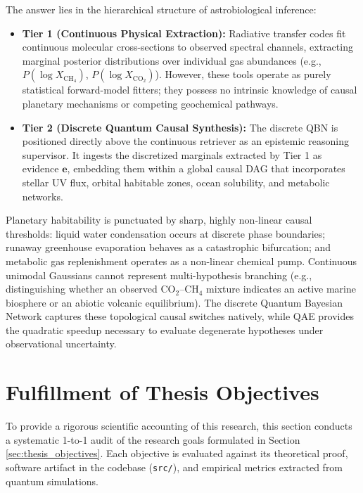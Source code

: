The answer lies in the hierarchical structure of astrobiological inference:
\begin{itemize}
    \item \textbf{Tier 1 (Continuous Physical Extraction):} Radiative transfer codes fit continuous molecular cross-sections to observed spectral channels, extracting marginal posterior distributions over individual gas abundances (e.g., $P(\log X_{\mathrm{CH}_4})$, $P(\log X_{\mathrm{CO}_2})$). However, these tools operate as purely statistical forward-model fitters; they possess no intrinsic knowledge of causal planetary mechanisms or competing geochemical pathways.
    \item \textbf{Tier 2 (Discrete Quantum Causal Synthesis):} The discrete QBN is positioned directly above the continuous retriever as an epistemic reasoning supervisor. It ingests the discretized marginals extracted by Tier 1 as evidence $\mathbf{e}$, embedding them within a global causal DAG that incorporates stellar UV flux, orbital habitable zones, ocean solubility, and metabolic networks. 
\end{itemize}

Planetary habitability is punctuated by sharp, highly non-linear causal thresholds: liquid water condensation occurs at discrete phase boundaries; runaway greenhouse evaporation behaves as a catastrophic bifurcation; and metabolic gas replenishment operates as a non-linear chemical pump. Continuous unimodal Gaussians cannot represent multi-hypothesis branching (e.g., distinguishing whether an observed $\mathrm{CO}_2$--$\mathrm{CH}_4$ mixture indicates an active marine biosphere or an abiotic volcanic equilibrium). The discrete Quantum Bayesian Network captures these topological causal switches natively, while QAE provides the quadratic speedup necessary to evaluate degenerate hypotheses under observational uncertainty.

\section{Fulfillment of Thesis Objectives}\label{sec:fulfillment_objectives}

To provide a rigorous scientific accounting of this research, this section conducts a systematic 1-to-1 audit of the research goals formulated in Section \ref{sec:thesis_objectives}. Each objective is evaluated against its theoretical proof, software artifact in the codebase (\texttt{src/}), and empirical metrics extracted from quantum simulations.

